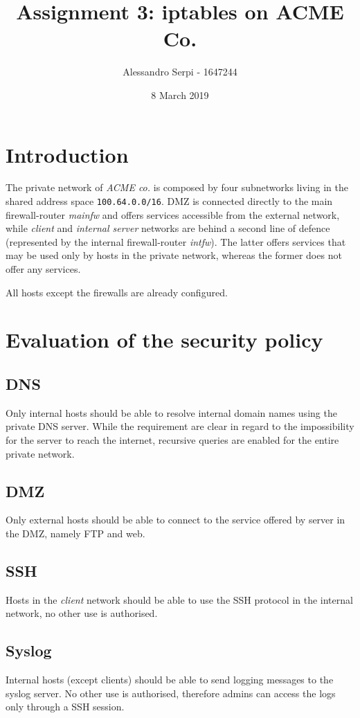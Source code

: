 \documentclass{homework}
\title{Assignment 3: iptables on ACME Co.}
\author{Alessandro Serpi - 1647244}
\date{8 March 2019}
\newcommand{\client}{\textit{client}\xspace}
\newcommand{\ser}{\textit{internal server}\xspace}
\newcommand{\intfw}{\textit{intfw}\xspace}
\newcommand{\mainfw}{\textit{mainfw}\xspace}
\begin{document}
    \maketitle
    \tableofcontents
    
    \pagebreak
    \section{Introduction}
    The private network of \textit{ACME co.} is composed by four subnetworks living in the shared address space \texttt{100.64.0.0/16}. DMZ is connected directly to the main firewall-router \mainfw and offers services accessible from the external network, while \client and \ser networks are behind a second line of defence (represented by the internal firewall-router \intfw). The latter offers services that may be used only by hosts in the private network, whereas the former does not offer any services.
    
    All hosts except the firewalls are already configured. 
    
    
    \section{Evaluation of the security policy}
    \subsection{DNS}
    Only internal hosts should be able to resolve internal domain names using the private DNS server.
    While the requirement are clear in regard to the impossibility for the server to reach the internet, recursive queries are enabled for the entire private network.
    
    \subsection{DMZ}
    Only external hosts should be able to connect to the service offered by server in the DMZ, namely FTP and web.
    
    \subsection{SSH}
    Hosts in the \client network should be able to use the SSH protocol in the internal network, no other use is authorised.
    
    \subsection{Syslog}
    Internal hosts (except clients) should be able to send logging messages to the syslog server.
    No other use is authorised, therefore admins can access the logs only through a SSH session.
\end{document}
